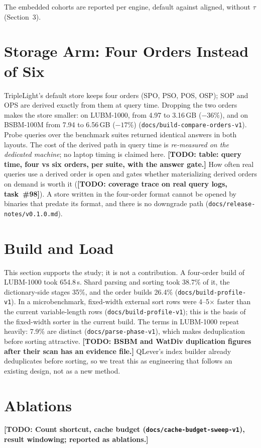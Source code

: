 \documentclass[11pt]{article}
\newcommand{\todo}[1]{\textbf{[TODO: #1]}}
\begin{document}
\noindent The embedded cohorts are reported per engine, default against aligned, without $\tau$ (Section~3).

\section{Storage Arm: Four Orders Instead of Six}
TripleLight's default store keeps four orders (SPO, PSO, POS, OSP); SOP and OPS are derived exactly from them at query time.
Dropping the two orders makes the store smaller: on LUBM-1000, from 4.97 to 3.16\,GB ($-36\%$), and on BSBM-100M from 7.94 to
6.56\,GB ($-17\%$) (\texttt{docs/build-compare-orders-v1}). Probe queries over the benchmark suites returned identical
answers in both layouts. The cost of the derived path in query time is \emph{re-measured on the dedicated machine}; no
laptop timing is claimed here. \todo{table: query time, four vs six orders, per suite, with the answer gate.}
How often real queries use a derived order is open and gates whether materializing derived orders on demand is worth it
(\todo{coverage trace on real query logs, task~\#98}). A store written in the four-order format cannot be opened by binaries
that predate its format, and there is no downgrade path (\texttt{docs/release-notes/v0.1.0.md}).

\section{Build and Load}
This section supports the study; it is not a contribution. A four-order build of LUBM-1000 took 654.8\,s. Shard parsing and
sorting took 38.7\% of it, the dictionary-side stages 35\%, and the order builds 26.4\% (\texttt{docs/build-profile-v1}).
In a microbenchmark, fixed-width external sort rows were 4--5$\times$ faster than the current variable-length rows
(\texttt{docs/build-profile-v1}); this is the basis of the fixed-width sorter in the current build. The terms in LUBM-1000 repeat heavily: 7.9\% are distinct (\texttt{docs/parse-phase-v1}), which makes
deduplication before sorting attractive. \todo{BSBM and WatDiv duplication figures after their scan has an evidence file.} QLever's index builder already deduplicates before sorting, so we treat this as
engineering that follows an existing design, not as a new method.

\section{Ablations}
\todo{Count shortcut, cache budget (\texttt{docs/cache-budget-sweep-v1}), result windowing; reported as ablations.}
\end{document}
